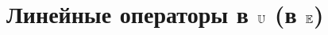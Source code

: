 \documentclass[../main.tex]{subfiles}
\begin{document}
\chapter{Линейные операторы в $\mathbb{U}$\; (в $\mathbb{E}$)}


\end{document}
